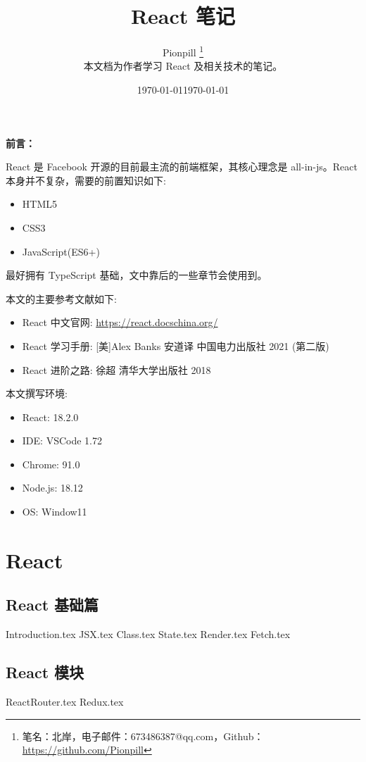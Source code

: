 \documentclass{PionpillNote-book}
\title{React 笔记}
\author{
    Pionpill \footnote{笔名：北岸，电子邮件：673486387@qq.com，Github：\url{https://github.com/Pionpill}} \\
    本文档为作者学习 React 及相关技术的笔记。\\
}
\date{\today}
\begin{document}
\pagestyle{plain}
\maketitle

\noindent\textbf{前言：}

React 是 Facebook 开源的目前最主流的前端框架，其核心理念是 all-in-js。React 本身并不复杂，需要的前置知识如下:
\begin{itemize}
    \item HTML5
    \item CSS3
    \item JavaScript(ES6+)
\end{itemize}

最好拥有 TypeScript 基础，文中靠后的一些章节会使用到。

本文的主要参考文献如下:
\begin{itemize}
    \item React 中文官网: \url{https://react.docschina.org/}
    \item React 学习手册: [美]Alex Banks 安道译 中国电力出版社 2021 (第二版)
    \item React 进阶之路: 徐超 清华大学出版社 2018
\end{itemize}

本文撰写环境:

\begin{itemize}
    \item React: 18.2.0
    \item IDE: VSCode 1.72 
    \item Chrome: 91.0
    \item Node.js: 18.12
    \item OS: Window11
\end{itemize}

\date{\today}
\newpage

\tableofcontents

\newpage

\setcounter{page}{1} 
\pagestyle{fancy}

\part{React}
\chapter{React 基础篇}
{Introduction.tex}
{JSX.tex}
{Class.tex}
{State.tex}
{Render.tex}
{Fetch.tex}
\chapter{React 模块}
{ReactRouter.tex}
{Redux.tex}
\end{document}
